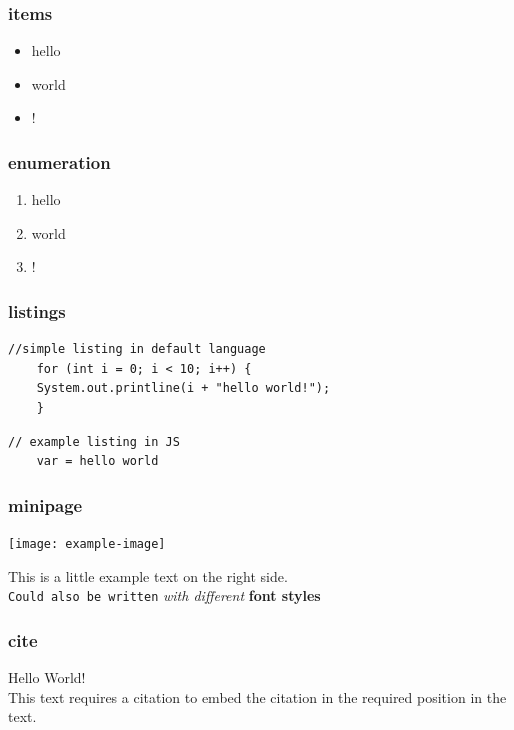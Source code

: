 \subsubsection{items}
\begin{itemize}
    \item hello
    \item world
    \item !
\end{itemize}

\subsubsection{enumeration}
\begin{enumerate}
    \item hello
    \item world
    \item !
\end{enumerate}

\subsubsection{listings}
\begin{lstlisting}[caption=example listing,label={lst:lstlisting}]
//simple listing in default language
    for (int i = 0; i < 10; i++) {
    System.out.printline(i + "hello world!");
    }
\end{lstlisting}

\begin{lstlisting}[firstnumber=17, caption=example listing, style=JavaScript,label={lst:lstlisting2}]
// example listing in JS
    var = hello world
\end{lstlisting}


\subsubsection{minipage}
\begin{minipage}{0.5\linewidth}
    \begin{center}
        \texttt{[image: example-image]}
        \vspace{-8pt}
    \end{center}
\end{minipage}
\begin{minipage}{0.45\linewidth}
    This is a little example text on the right side.\\
    \texttt{Could also be written} \textit{with different} \textbf{font styles}
\end{minipage}

\subsubsection{cite}
Hello World!\cite{DummyEntry} \\

This text requires a citation \cite{einstein} to embed the citation in the required position in the text.